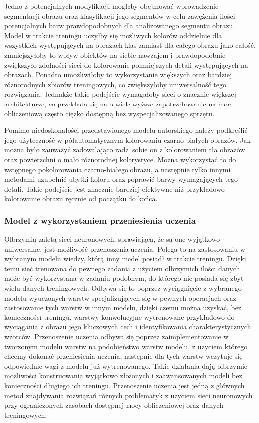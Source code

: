   Jedno z potencjalnych modyfikacji mogłoby obejmować
  wprowadzenie segmentacji obrazu oraz klasyfikacji jego segmentów w celu
  zawężenia ilości potencjalnych barw prawdopodobnych dla analizowanego segmentu obrazu.
  Model w trakcie treningu uczyłby się możliwych kolorów oddzielnie dla wszystkich
  występujących na obrazach klas zamiast dla całego obrazu jako całość,
  zmniejszyłoby to wpływ obiektów na siebie nawzajem i prawdopodobnie zwiększyło
  zdolności sieci do kolorowanie pomniejszych detali występujących na obrazach.
  Ponadto umożliwiłoby to wykorzystanie większych oraz bardziej różnorodnych
  zbiorów treningowych, co zwiększyłoby uniwersalność tego rozwiązania.
  Jednakże takie podejście wymagałoby sieci o znacznie większej architekturze,
  co przekłada się na o wiele wyższe zapotrzebowanie na moc obliczeniową często
  ciężko dostępną bez wyspecjalizowanego sprzętu.

  Pomimo niedoskonałości przedstawionego modelu autorskiego należy podkreślić jego
  użyteczność w półautomatycznym kolorowaniu czarno-białych obrazów. Jak można
  było zauważyć zadowalająco radzi sobie on z kolorowaniem tła obrazów oraz
  powierzchni o mało różnorodnej kolorystyce. Można wykorzystać to do wstępnego
  pokolorowania czarno-białego obrazu, a następnie tylko innymi metodami uzupełnić
  ubytki koloru oraz poprawić barwy wymagających tego detali. Takie podejście
  jest znacznie bardziej efektywne niż przykładowo kolorowanie obrazu ręcznie od
  początku do końca.


  \subsubsection{Model z wykorzystaniem przeniesienia uczenia} \label{transfer model}

  Olbrzymią zaletą sieci neuronowych, sprawiającą, że są one wyjątkowo
  uniwersalne, jest możliwość przenoszenia uczenia. Polega
  to na zastosowaniu w wybranym modelu wiedzy, którą inny model posiadł w trakcie
  treningu. Dzięki temu sieć trenowana do pewnego zadania z użyciem olbrzymich
  ilości danych może być wykorzystana w zadaniu podobnym, do którego nie
  posiada się zbyt wielu danych treningowych. Odbywa się to poprzez
  wyciągnięcie z wybranego modelu wyuczonych warstw specjalizujących się w
  pewnych operacjach oraz zastosowanie tych warstw w innym modelu, dzięki
  czemu można uzyskać, bez konieczności treningu, warstwy konwolucyjne wytrenowane
  przykładowo do wyciągania z obrazu jego kluczowych cech i identyfikowania
  charakterystycznych wzorców.
  Przenoszenie uczenia odbywa się poprzez zaimplementowanie w tworzonym modelu
  warstw na podobieństwo warstw modelu, z użyciem którego chcemy dokonać
  przeniesienia uczenia, następnie dla tych warstw wczytuje się odpowiednie wagi
  z modelu już wytrenowanego.
  Takie działania dają olbrzymie możliwości konstruowania wyjątkowo złożonych i
  zaawansowanych modeli bez konieczności długiego ich treningu. Przenoszenie
  uczenia jest jedną z głównych metod znajdywania rozwiązań różnych problematyk
  z użyciem sieci neuronowych przy ograniczonych zasobach dostępnej mocy
  obliczeniowej oraz danych treningowych.

